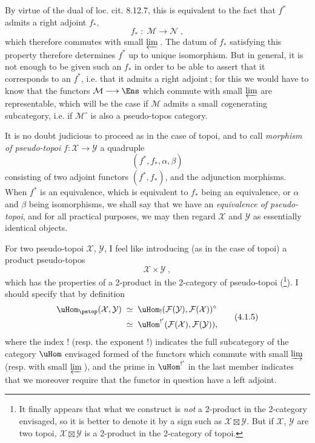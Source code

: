 By virtue of the dual of loc. cit. 8.12.7, this is equivalent to the fact that $f^*$ admits a right adjoint $f_*$,
\[
f_* \;:\; \mathcal{M} \longrightarrow \mathcal{N}\;,
\tag*{(4.1.2)}
\]
which therefore commutes with small $\varprojlim$\,. The datum of $f_*$ satisfying this property therefore determines $f^*$ up to unique isomorphism. But in general, it is not enough to be given such an $f_*$ in order to be able to assert that it corresponds to an $f^*$, i.e. that it admits a right adjoint\,; for this we would have to know that the functors $\mathcal{M}\longrightarrow\Ens$ which commute with small $\varprojlim$ are representable, which will be the case if $\mathcal{M}$ admits a small \textit{co}generating subcategory, i.e. if $\mathcal{M}^\circ$ is also a pseudo-topos category. %

\newpage


It is no doubt judicious to proceed as in the case of topoi, and to call \textit{morphism of pseudo-topoi} $f:\mathcal{X}\longrightarrow\mathcal{Y}$ a quadruple
\[
(f^*,f_*,\alpha,\beta)
\tag*{(4.1.3)}
\]
consisting of two adjoint functors $(f^*,f_*)$, and the adjunction morphisms. When $f^*$ is an equivalence, which is equivalent to $f_*$ being an equivalence, or $\alpha$ and $\beta$ being isomorphisms, we shall say that we have an \textit{equivalence of pseudo-topoi}, and for all practical purposes, we may then regard $\mathcal{X}$ and $\mathcal{Y}$ as essentially identical objects.

For two pseudo-topoi $\mathcal{X}$, $\mathcal{Y}$, I feel like introducing (as in the case of topoi) a product pseudo-topos
\[
\mathcal{X}\times\mathcal{Y}\;,
\tag*{(4.1.4)}
\]
which has the properties of a 2-product in the 2-category of pseudo-topoi (\footnote{It finally appears that what we construct is \textit{not} a 2-product in the 2-category envisaged, so it is better to denote it by a sign such as $\mathcal{X}\boxtimes\mathcal{Y}$. But if $\mathcal{X}$, $\mathcal{Y}$ are two topoi, $\mathcal{X}\boxtimes\mathcal{Y}$ is a 2-product in the 2-category of topoi.}). I should specify that by definition
\[
\begin{aligned}
\uHom_{\pstop}(\mathcal{X},\mathcal{Y}) \;&\simeq\; \uHom_!(\mathcal{F}(\mathcal{Y}),\mathcal{F}(\mathcal{X}))^\circ\\
&\simeq\; \uHom^{!'}(\mathcal{F}(\mathcal{X}),\mathcal{F}(\mathcal{Y})),
\end{aligned}
\tag*{(4.1.5)}
\]
where the index ! (resp. the exponent !) indicates the full subcategory of the category $\uHom$ envisaged formed of the functors which commute with small $\varinjlim$ (resp. with small
$\varprojlim$\,), and the prime in $\uHom^{!'}$ in the last member indicates that we moreover require that the functor in question have a left adjoint.

